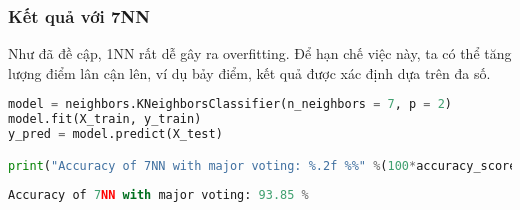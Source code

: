 





\subsubsection{Kết quả với 7NN}
Như đã đề cập, 1NN rất dễ gây ra overfitting. Để hạn chế việc này, ta có thể
tăng lượng điểm lân cận lên, ví dụ bảy điểm, kết quả được xác định dựa trên đa
số.

\begin{lstlisting}[language=Python]
model = neighbors.KNeighborsClassifier(n_neighbors = 7, p = 2)
model.fit(X_train, y_train)
y_pred = model.predict(X_test)

print("Accuracy of 7NN with major voting: %.2f %%" %(100*accuracy_score(y_test, y_pred)))

\end{lstlisting}
\kq 
\begin{lstlisting}[language=Python]
Accuracy of 7NN with major voting: 93.85 %
\end{lstlisting}


